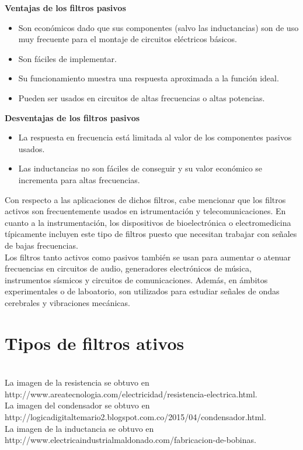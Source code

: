 \documentclass[prb,aps,preprintnumbers,amsmath,amssymb]{revtex4}
\begin{document}
\textbf{Ventajas de los filtros pasivos}

\begin{itemize}
	\item Son económicos dado que sus componentes (salvo las inductancias) son de uso muy frecuente para el montaje de circuitos eléctricos básicos.
	
	\item Son fáciles de implementar.
	
	\item Su funcionamiento muestra una respuesta aproximada a la función ideal.
	
	\item Pueden ser usados en circuitos de altas frecuencias o altas potencias.
\end{itemize}

\textbf{Desventajas de los filtros pasivos}

\begin{itemize}
	\item La respuesta en frecuencia está limitada al valor de los componentes pasivos usados.
	
	\item Las inductancias no son fáciles de conseguir y su valor económico se incrementa para altas frecuencias.
\end{itemize}

Con respecto a las aplicaciones de dichos filtros, cabe mencionar que los filtros activos son frecuentemente usados en istrumentación y telecomunicaciones. En cuanto a la instrumentación, los dispositivos de bioelectrónica o electromedicina típicamente incluyen este tipo de filtros puesto que necesitan trabajar con señales de bajas frecuencias. \\

Los filtros tanto activos como pasivos también se usan para aumentar o atenuar frecuencias en circuitos de audio, generadores electrónicos de música, instrumentos sísmicos y circuitos de comunicaciones. Además, en ámbitos experimentales o de laboatorio, son utilizados para estudiar señales de ondas cerebrales y vibraciones mecánicas.\\

\section{Tipos de filtros ativos}


\begin{thebibliography}{99}
\
\\
 La imagen de la resistencia se obtuvo en http://www.areatecnologia.com/electricidad/resistencia-electrica.html.\\

 La imagen del condensador se obtuvo en http://logicadigitaltemario2.blogspot.com.co/2015/04/condensador.html.\\

 La imagen de la inductancia se obtuvo en http://www.electricaindustrialmaldonado.com/fabricacion-de-bobinas.\\


\end{thebibliography}
\end{document}
